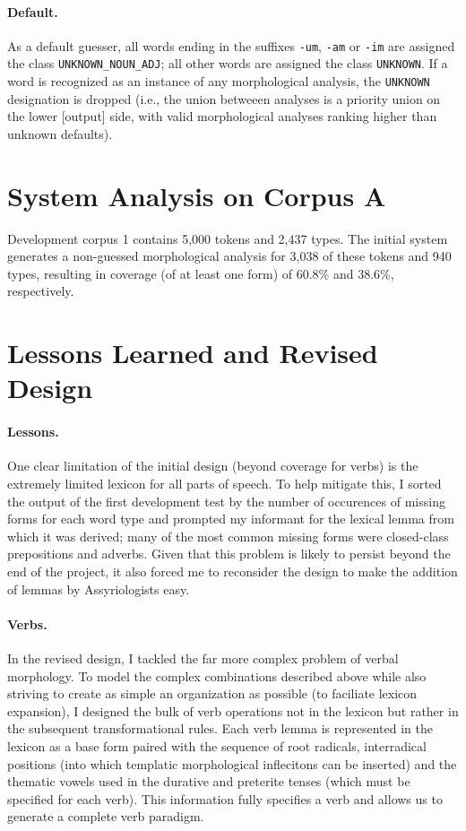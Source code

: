 \documentclass[11pt,letterpaper]{article}
\begin{document}
\paragraph{Default.}

As a default guesser, all words ending in the suffixes \texttt{-um}, \texttt{-am} or \texttt{-im} are assigned the class \texttt{UNKNOWN\_NOUN\_ADJ}; all other words are assigned the class \texttt{UNKNOWN}.  If a word is recognized as an instance of any morphological analysis, the \texttt{UNKNOWN} designation is dropped (i.e., the union betweeen analyses is a priority union on the lower [output] side, with valid morphological analyses ranking higher than unknown defaults). 

\section{System Analysis on Corpus A}

Development corpus 1 contains 5,000 tokens and 2,437 types.  The initial system generates a non-guessed morphological analysis for 3,038 of these tokens and 940 types, resulting in coverage (of at least one form) of 60.8\% and 38.6\%, respectively.

\section{Lessons Learned and Revised Design}

\paragraph{Lessons.}
One clear limitation of the initial design (beyond coverage for verbs) is the extremely limited lexicon for all parts of speech.  To help mitigate this, I sorted the output of the first development test by the number of occurences of missing forms for each word type and prompted my informant for the lexical lemma from which it was derived; many of the most common missing forms were closed-class prepositions and adverbs.  Given that this problem is likely to persist beyond the end of the project, it also forced me to reconsider the design to make the addition of lemmas by Assyriologists easy. 

\paragraph{Verbs.}
In the revised design, I tackled the far more complex problem of verbal morphology.
To model the complex combinations described above while also striving to create as simple an organization as possible (to faciliate lexicon expansion), I designed the bulk of verb operations not in the lexicon but rather in the subsequent transformational rules. Each verb lemma is represented in the lexicon as a base form paired with the sequence of root radicals, interradical positions (into which templatic morphological inflecitons can be inserted) and the thematic vowels used in the durative and preterite tenses (which must be specified for each verb).  This information fully specifies a verb and allows us to generate a complete verb paradigm.
\end{document}
